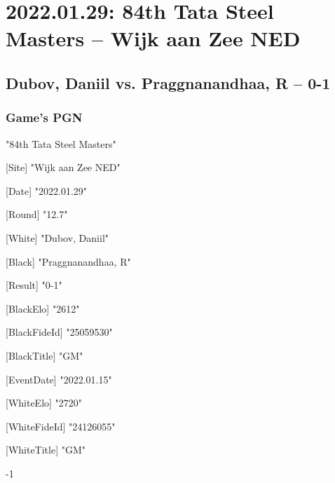 \documentclass[9pt]{extarticle}
\begin{document}
\section*{2022.01.29: 84th Tata Steel Masters -- Wijk aan Zee NED}

\subsection*{Dubov, Daniil vs. Praggnanandhaa, R -- 0-1}
\subsubsection*{Game's PGN}
\begin{flushleft}
[Event] "84th Tata Steel Masters"

[Site] "Wijk aan Zee NED"

[Date] "2022.01.29"

[Round] "12.7"

[White] "Dubov, Daniil"

[Black] "Praggnanandhaa, R"

[Result] "0-1"

[BlackElo] "2612"

[BlackFideId] "25059530"

[BlackTitle] "GM"

[EventDate] "2022.01.15"

[WhiteElo] "2720"

[WhiteFideId] "24126055"

[WhiteTitle] "GM"

\end{flushleft}
\begin{flushleft}
 \quad  {}-1
\end{flushleft}
\parindent 0mm
\end{document}
